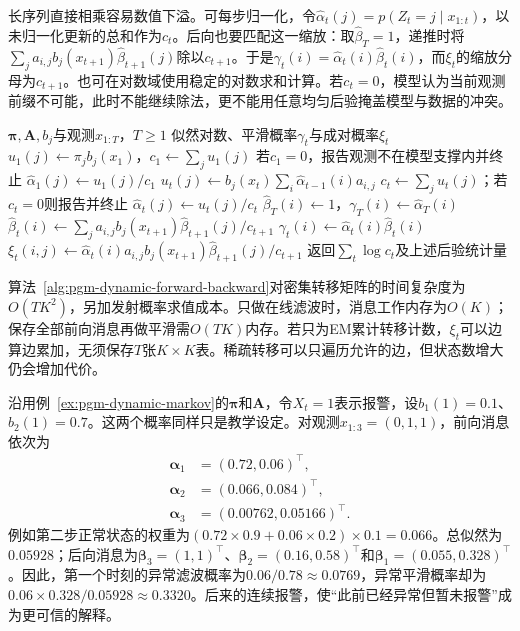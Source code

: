 长序列直接相乘容易数值下溢。可每步归一化，令$\widehat\alpha_t(j)=p(Z_t=j\mid x_{1:t})$，以未归一化更新的总和作为$c_t$。后向也要匹配这一缩放：取$\widehat\beta_T=1$，递推时将$\sum_j a_{i,j}b_j(x_{t+1})\widehat\beta_{t+1}(j)$除以$c_{t+1}$。于是$\gamma_t(i)=\widehat\alpha_t(i)\widehat\beta_t(i)$，而$\xi_t$的缩放分母为$c_{t+1}$。也可在对数域使用稳定的对数求和计算。若$c_t=0$，模型认为当前观测前缀不可能，此时不能继续除法，更不能用任意均匀后验掩盖模型与数据的冲突。

\begin{algorithm}
  \label{alg:pgm-dynamic-forward-backward}
  \begin{algorithmic}[1]
    \Require $\bm{\pi},\bm{A},b_j$与观测$x_{1:T}$，$T\geq1$
    \Ensure 似然对数、平滑概率$\gamma_t$与成对概率$\xi_t$
    \State $u_1(j)\gets\pi_jb_j(x_1)$，$c_1\gets\sum_j u_1(j)$
    \State 若$c_1=0$，报告观测不在模型支撑内并终止
    \State $\widehat\alpha_1(j)\gets u_1(j)/c_1$
      \State $u_t(j)\gets b_j(x_t)\sum_i\widehat\alpha_{t-1}(i)a_{i,j}$
      \State $c_t\gets\sum_j u_t(j)$；若$c_t=0$则报告并终止
      \State $\widehat\alpha_t(j)\gets u_t(j)/c_t$
    \EndFor
    \State $\widehat\beta_T(i)\gets1$，$\gamma_T(i)\gets\widehat\alpha_T(i)$
      \State $\widehat\beta_t(i)\gets
        \sum_j a_{i,j}b_j(x_{t+1})\widehat\beta_{t+1}(j)/c_{t+1}$
      \State $\gamma_t(i)\gets\widehat\alpha_t(i)\widehat\beta_t(i)$
      \State $\xi_t(i,j)\gets
        \widehat\alpha_t(i)a_{i,j}b_j(x_{t+1})
        \widehat\beta_{t+1}(j)/c_{t+1}$
    \EndFor
    \State 返回$\sum_t\log c_t$及上述后验统计量
  \end{algorithmic}
\end{algorithm}

算法~\ref{alg:pgm-dynamic-forward-backward}对密集转移矩阵的时间复杂度为$O(TK^2)$，另加发射概率求值成本。只做在线滤波时，消息工作内存为$O(K)$；保存全部前向消息再做平滑需$O(TK)$内存。若只为EM累计转移计数，$\xi_t$可以边算边累加，无须保存$T$张$K\times K$表。稀疏转移可以只遍历允许的边，但状态数增大仍会增加代价。

\begin{example}[报警证据怎样改变过去的判断]
  \label{ex:pgm-dynamic-hmm}
  沿用例~\ref{ex:pgm-dynamic-markov}的$\bm{\pi}$和$\bm{A}$，令$X_t=1$表示报警，设$b_1(1)=0.1$、$b_2(1)=0.7$。这两个概率同样只是教学设定。对观测$x_{1:3}=(0,1,1)$，前向消息依次为
  \[
    \begin{aligned}
      \bm{\alpha}_1&=(0.72,0.06)^\top,\\
      \bm{\alpha}_2&=(0.066,0.084)^\top,\\
      \bm{\alpha}_3&=(0.00762,0.05166)^\top.
    \end{aligned}
  \]
  例如第二步正常状态的权重为$(0.72\times0.9+0.06\times0.2)\times0.1=0.066$。总似然为$0.05928$；后向消息为$\bm{\beta}_3=(1,1)^\top$、$\bm{\beta}_2=(0.16,0.58)^\top$和$\bm{\beta}_1=(0.055,0.328)^\top$。因此，第一个时刻的异常滤波概率为$0.06/0.78\approx0.0769$，异常平滑概率却为$0.06\times0.328/0.05928\approx0.3320$。后来的连续报警，使“此前已经异常但暂未报警”成为更可信的解释。
\end{example}

